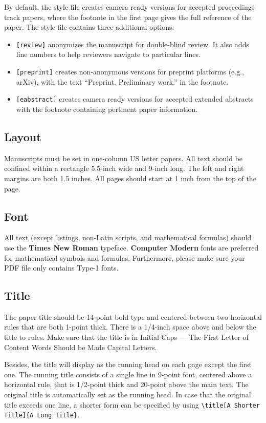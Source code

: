 \documentclass{article}
\begin{document}
By default, the style file creates camera ready versions for accepted proceedings track papers, where the footnote in the first page gives the full reference of the paper.
The style file contains three additional options:
\begin{itemize}
	\item \verb+[review]+ anonymizes the manuscript for double-blind review. It also adds line numbers to help reviewers navigate to particular lines.
	\item \verb+[preprint]+ creates non-anonymous versions for preprint platforms (e.g., arXiv), with the text ``Preprint. Preliminary work.'' in the footnote.
	\item \verb+[eabstract]+ creates camera ready versions for accepted extended abstracts with the footnote containing pertinent paper information.
\end{itemize}

\subsection{Layout}
Manuscripts must be set in one-column US letter papers.
All text should be confined within a rectangle 5.5-inch wide and 9-inch long.
The left and right margins are both 1.5 inches.
All pages should start at 1 inch from the top of the page.

\subsection{Font}
All text (except listings, non-Latin scripts, and mathematical formulas) should use the \textbf{Times New Roman} typeface.
\textbf{Computer Modern} fonts are preferred for mathematical symbols and formulas.
Furthermore, please make sure your PDF file only contains Type-1 fonts.

\subsection{Title}

The paper title should be 14-point bold type and centered between two horizontal rules that are both 1-point thick.
There is a 1/4-inch space above and below the title to rules.
Make sure that the title is in Initial Caps --- The First Letter of Content Words Should be Made Capital Letters.

Besides, the title will display as the running head on each page except the first one.
The running title consists of a single line in 9-point font, centered above a horizontal rule, that is 1/2-point thick and 20-point above the main text.
The original title is automatically set as the running head.
In case that the original title exceeds one line, a shorter form can be specified by using \verb+\title[A Shorter Title]{A Long Title}+.
\end{document}
